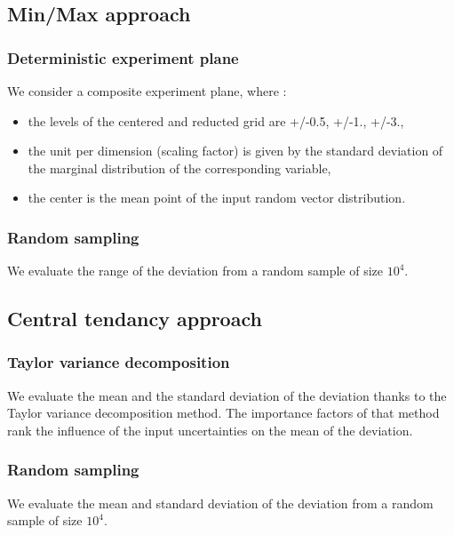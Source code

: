 \documentclass[11pt]{article}
\begin{document}
\subsection{Min/Max approach}


\subsubsection{Deterministic experiment plane}

We consider a composite experiment plane, where :
\begin{itemize}
\item the levels of the centered and reducted grid are +/-0.5, +/-1., +/-3.,
\item the unit per dimension (scaling factor) is given by the standard deviation of the marginal distribution of the corresponding variable,
\item the center is the mean point of the input random vector distribution.
\end{itemize}



\subsubsection{Random sampling}

We evaluate the range of the deviation from a random sample of size $10^4$.



\subsection{Central tendancy approach}


\subsubsection{Taylor variance decomposition}

We evaluate the mean and the standard deviation of the deviation thanks to the Taylor variance decomposition method. The importance factors of that method rank the influence of the input uncertainties on the mean of the deviation.

\subsubsection{Random sampling}

We evaluate the mean and standard deviation of the deviation from a random sample of size $10^4$.
\end{document}
